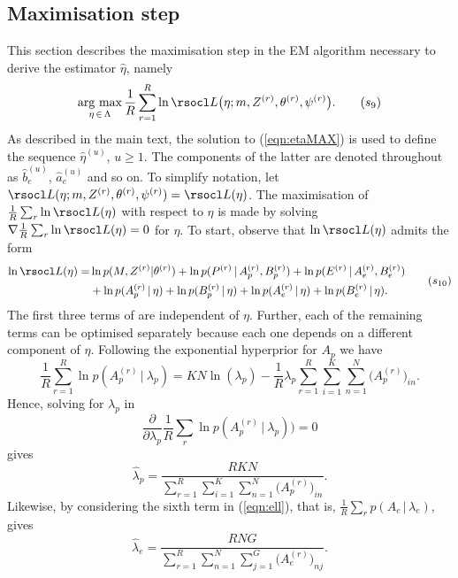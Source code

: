 \documentclass[11pt]{amsart}
\theoremstyle{definition}
\begin{document}
\subsection{Maximisation step}
This section describes the maximisation step in the EM algorithm
necessary to derive the estimator $\hat\eta$, namely
\begin{equation}
   \label{eqn:etaMAX}
    \underset{\eta\,\in\,\Lambda}{\text{arg max}}\,
    \frac{1}{R}\sum_{r=1}^R \ln \rsocl L\big(\eta; m, Z^{(r)},
    \theta^{(r)}, \psi^{(r)}\big). \tag{$s_9$} 
\end{equation}
As described in the main text, the solution to (\ref{eqn:etaMAX}) is
used to define the sequence $\hat\eta^{(u)}$, $u \geq 1$. The
components of the latter are denoted throughout as $\hat b_e^{(u)}$,
$\hat a_e^{(u)}$ and so on.  To simplify notation, let $\rsocl L(\eta;
m, Z^{(r)}, \theta^{(r)}, \psi^{(r)}) = \rsocl L(\eta)$. The
maximisation of $\frac{1}{R}\sum_{r} \ln \rsocl L(\eta)$ with respect
to $\eta$ is made by solving $\nabla\frac{1}{R}\sum_{r}\ln \rsocl
L(\eta) = 0$ for $\eta$.  To start, observe that $\ln \rsocl L(\eta)$
admits the form
\begin{equation}
 \label{eqn:ell}
 \begin{aligned}
  \ln \rsocl L(\eta)
  =&
  \ln p(M, Z^{(r)} | \theta^{(r)})  + \ln p(P^{(r)}\,|\, A_p^{(r)},
  B_p^{(r)}) + \ln p(E^{(r)}\,|\, A_e^{(r)},  B_e^{(r)})  \\
  &+
  \ln p(A_p^{(r)}\,|\, \eta) + \ln p(B_p^{(r)}\,|\, \eta) +
  \ln p(A_e^{(r)}\,|\, \eta) + \ln p(B_e^{(r)}\,|\, \eta).
 \end{aligned}
 \tag{$s_{10}$}
\end{equation}
The first three terms of are independent of
$\eta$. Further, each of the remaining terms can be optimised
separately because each one depends on a different component of
$\eta$. Following the exponential hyperprior for $A_p$ we have
\[
   \frac{1}{R}\sum_{r=1}^R \ln  p(A_p^{(r)}\,|\ \lambda_p)
  = 
  KN\ln(\lambda_p) - \frac{1}{R}\lambda_p
  \sum_{r=1}^R\sum_{i=1}^K\sum_{n=1}^N \big(A_p^{(r)}\big)_{in}.
\]
Hence, solving for $\lambda_p$ in 
\[
  \frac{\partial}{\partial\lambda_p} \frac{1}{R}\sum_r \ln
  p(A_p^{(r)}\,|\ \lambda_p)) = 0
\] 
gives
\[
  \widehat\lambda_p = \frac{RKN}{\sum_{r=1}^R \sum_{i=1}^K 
    \sum_{n=1}^N \big(A_p^{(r)}\big)_{in}}.
\]
Likewise, by considering the sixth term in
(\ref{eqn:ell}), that is, $\frac{1}{R} \sum_r 
p(A_e\,|\, \lambda_e)$, gives
\[
  \widehat\lambda_e = \frac{RNG}{\sum_{r=1}^R \sum_{n=1}^N
    \sum_{j=1}^G \big(A_e^{(r)}\big)_{nj}}.
\]
\end{document}
